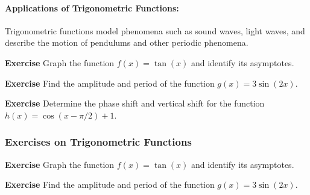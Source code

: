 \documentclass[a4paper,12pt]{book}
\newenvironment{exercise}[1][]
  {\par\medskip\noindent\textbf{Exercise #1} \rmfamily}
  {\medskip}
\begin{document}

\paragraph{Applications of Trigonometric Functions:}
Trigonometric functions model phenomena such as sound waves, light waves, and describe the motion of pendulums and other periodic phenomena.

\begin{exercise}
Graph the function \( f(x) = \tan(x) \) and identify its asymptotes.
\end{exercise}

\begin{exercise}
Find the amplitude and period of the function \( g(x) = 3\sin(2x) \).
\end{exercise}

\begin{exercise}
Determine the phase shift and vertical shift for the function \( h(x) = \cos(x - \pi/2) + 1 \).
\end{exercise}

\subsubsection*{Exercises on Trigonometric Functions}

\begin{exercise}
Graph the function \( f(x) = \tan(x) \) and identify its asymptotes.
\end{exercise}

\begin{exercise}
Find the amplitude and period of the function \( g(x) = 3\sin(2x) \).
\end{exercise}
\end{document}
